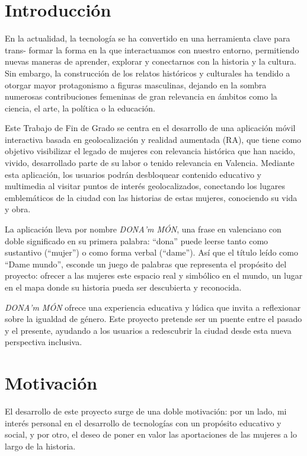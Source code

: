 
\section{Introducción}


En la actualidad, la tecnología se ha convertido en una herramienta clave para trans-
formar la forma en la que interactuamos con nuestro entorno, permitiendo nuevas maneras
de aprender, explorar y conectarnos con la historia y la cultura. Sin embargo, la construcción de los relatos históricos y culturales ha tendido a otorgar mayor protagonismo a figuras masculinas, dejando en la sombra numerosas contribuciones femeninas de gran relevancia en ámbitos como la ciencia, el arte, la política o la educación.

Este Trabajo de Fin de Grado se centra en el desarrollo de una aplicación móvil interactiva basada en geolocalización y realidad aumentada (RA), que tiene como objetivo visibilizar el legado de mujeres con relevancia histórica que han nacido, vivido, desarrollado parte de su labor o tenido relevancia en Valencia. Mediante esta aplicación, los usuarios podrán desbloquear contenido educativo y multimedia al visitar puntos de interés geolocalizados, conectando los lugares emblemáticos de la ciudad con las historias de estas mujeres, conociendo su vida y obra.

La aplicación lleva por nombre \textit{DONA'm MÓN}, una frase en valenciano con doble significado en su primera palabra: “dona” puede leerse tanto como sustantivo (“mujer”) o como forma verbal (“dame”).  Así que el título leído como “Dame mundo”, esconde un juego de palabras que representa el propósito del proyecto: ofrecer a las mujeres este espacio real y simbólico en el mundo, un lugar en el mapa donde su historia pueda ser descubierta y reconocida.

\textit{DONA'm MÓN} ofrece una experiencia educativa y lúdica que invita a reflexionar sobre la igualdad de género. Este proyecto pretende ser un puente entre el pasado y el presente, ayudando a los usuarios a redescubrir la ciudad desde esta nueva perspectiva inclusiva.



\section{Motivación}
El desarrollo de este proyecto surge de una doble motivación: por un lado, mi interés personal en el desarrollo de tecnologías con un propósito educativo y social, y por otro, el deseo de poner en valor las aportaciones de las mujeres a lo largo de la historia.

